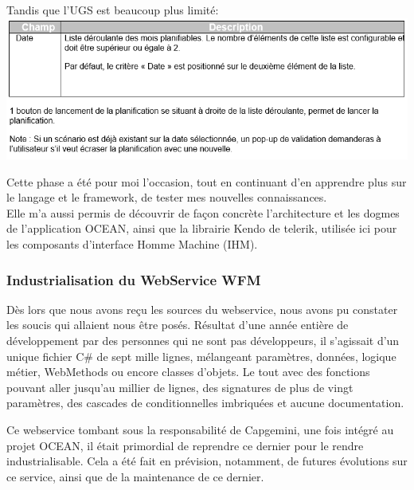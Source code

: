 \documentclass{rapport}
\begin{document}
Tandis que l'UGS est beaucoup plus limité:\\
\includegraphics[width=.95\textwidth]{fig/fig19_PlanoHUGSFonct.png}

Cette phase a été pour moi l'occasion, tout en continuant d'en apprendre plus sur le langage et le framework, de tester mes nouvelles connaissances.\\
Elle m'a aussi permis de découvrir de façon concrète l'architecture et les dogmes de l'application OCEAN, ainsi que la librairie Kendo de telerik, utilisée ici pour les composants d'interface Homme Machine (IHM).\\

\subsubsection{Industrialisation du WebService WFM}

Dès lors que nous avons reçu les sources du webservice, nous avons pu constater les soucis qui allaient nous être posés. Résultat d'une année entière de développement par des personnes qui ne sont pas développeurs, il s'agissait d'un unique fichier C\# de sept mille lignes, mélangeant paramètres, données, logique métier, WebMethods ou encore classes d'objets. Le tout avec des fonctions pouvant aller jusqu'au millier de lignes, des signatures de plus de vingt paramètres, des cascades de conditionnelles imbriquées et aucune documentation.\\


Ce webservice tombant sous la responsabilité de Capgemini, une fois intégré au projet OCEAN, il était primordial de reprendre ce dernier pour le rendre industrialisable. Cela a été fait en prévision, notamment, de futures évolutions sur ce service, ainsi que de la maintenance de ce dernier.\\
\end{document}
